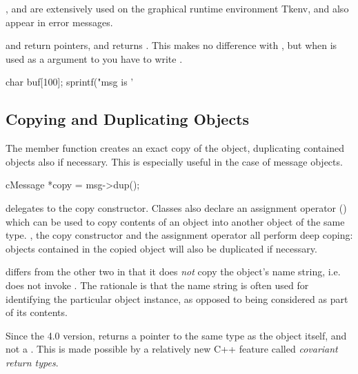 ,  and 
are extensively used on the graphical runtime environment Tkenv,
and also appear in error messages.

 and  return  pointers,
and  returns . This makes no difference
with , but when  is used as a  argument
to  you have to write .

\begin{cpp}
char buf[100];
sprintf("msg is '%
\end{cpp}


\subsection{Copying and Duplicating Objects}


The  member function creates an exact copy of the
object, duplicating
contained objects also if necessary. This is especially useful in the
case of message objects.

\begin{cpp}
cMessage *copy = msg->dup();
\end{cpp}

 delegates to the copy constructor. Classes also declare
an assignment operator () which can be used to copy contents
of an object into another object of the same type. , the copy
constructor and the assignment operator all perform deep coping: objects
contained in the copied object will also be duplicated if necessary.

 differs from the other two in that it does \textit{not}
copy the object's name string, i.e. does not invoke .
The rationale is that the name string is often used for identifying the particular
object instance, as opposed to being considered as part of its contents.

\begin{note}
    Since the {\opp} 4.0 version,  returns a pointer to
    the same type as the object itself, and not a .
    This is made possible by a relatively new C++ feature called
    \textit{covariant return types}.
\end{note}

